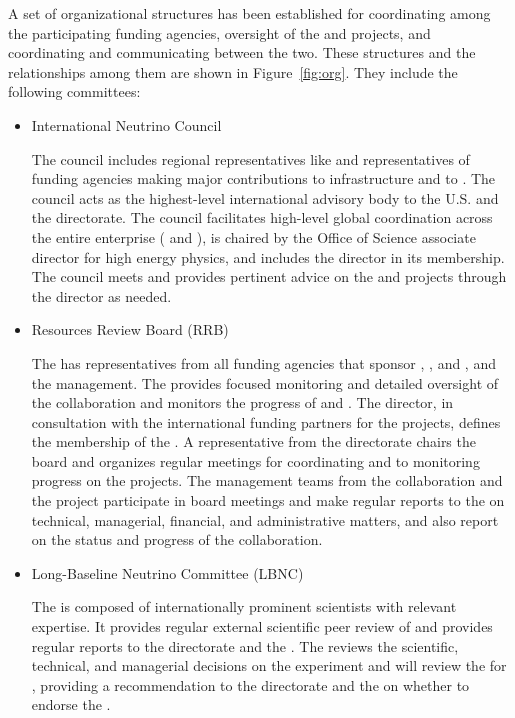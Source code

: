 A set  of  organizational structures  has been established  for
coordinating  among  the  participating  funding agencies,
oversight of the  and  projects,
and coordinating and communicating between the 
two. These structures and the relationships among them are shown 
in Figure~\ref{fig:org}. They include %
the following committees:
\begin{itemize}
\item International Neutrino Council 

The council  includes %
regional representatives like  and representatives of funding agencies making major contributions to  infrastructure and to . The council acts as the highest-level international advisory body to the U.S.  and the  directorate. The council facilitates high-level global coordination across the entire enterprise ( and ), is chaired by the  Office of Science associate director for high energy physics, and includes the  director in its membership. The council meets and provides pertinent advice on the  and  projects through the  director as needed.
\item Resources Review Board (RRB)

The  has representatives from all funding agencies that sponsor , , and , and the  management. The  provides focused monitoring and detailed oversight of the  collaboration and monitors the progress of  and . The  director,  in consultation with the international funding partners for the projects, defines the membership of the . A representative from the  directorate chairs the board and organizes regular meetings for coordinating and to monitoring progress on the projects. The management teams from the  collaboration and the  project participate in board meetings and make regular reports to the  on technical, managerial, financial, and administrative matters, %
and also report on the status and progress of the  collaboration.

\item Long-Baseline Neutrino Committee (LBNC)

The  is composed of internationally prominent scientists with relevant expertise. It provides regular external scientific peer review of  and provides regular reports to the   directorate and the . The  reviews the scientific, technical, and managerial decisions on the  experiment and will review the  for , providing a recommendation to the  directorate and the  on whether to endorse the .




\end{itemize}
